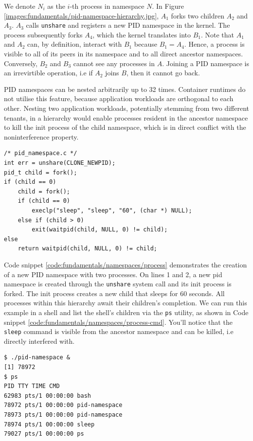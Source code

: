 We denote $N_{i}$ as the $i$-th process in namespace $N$. 
In Figure \ref{images:fundamentals/pid-namespace-hierarchy.jpg},
$A_{1}$ forks two children $A_{2}$ and $A_{3}$. 
$A_{3}$ calls \verb|unshare| and registers a new PID namespace in the kernel. The process 
subsequently forks $A_{4}$, which the kernel translates into $B_{1}$.
Note that $A_{1}$ and $A_{2}$ can, by definition, interact with $B_{1}$ because $B_{1} = A_{4}$.  
Hence, a process is visible to all of its peers in its namespace and to all direct ancestor
namespaces. Conversely, $B_{2}$ and $B_{3}$ cannot see any processes in $A$. 
Joining a PID namespace is an irrevirtible operation, i.e if $A_{2}$ joins $B$,
then it cannot go back.

PID namespaces can be nested arbitrarily up to 32 times. 
Container runtimes do not utilise this feature, because application workloads are orthogonal 
to each other. Nesting two application workloads, potentially stemming from two different tenants, in a hierarchy
would enable processes resident in the ancestor namespace to kill the init process of the child namespace, which 
is in direct conflict with the noninterference property. 

\begin{lstlisting}[style=c-code-snippets, label={code:fundamentals/namespaces/process}, caption={PID namespace creation pseudocode}]
/* pid_namespace.c */
int err = unshare(CLONE_NEWPID);
pid_t child = fork();
if (child == 0) 
    child = fork();
    if (child == 0)
        execlp("sleep", "sleep", "60", (char *) NULL);
    else if (child > 0)
        exit(waitpid(child, NULL, 0) != child);
else 
    return waitpid(child, NULL, 0) != child;
\end{lstlisting}

Code snippet \ref{code:fundamentals/namespaces/process} demonstrates the creation of a new 
PID namespace with two processes. On lines 1 and 2, a new 
pid namespace is created through the \verb|unshare| system call and its init process is forked. 
The init process creates a new child that sleeps for 60 seconds. All processes within this 
hierarchy await their children's completion. 
We can run this example in a shell and list the shell's children via the \verb|ps|
utility, as shown in Code snippet \ref{code:fundamentals/namespaces/process-cmd}. 
You'll notice that the \verb|sleep| command is visible from the ancestor namespace and can be killed,
i.e directly interfered with. 
\begin{lstlisting}[label={code:fundamentals/namespaces/process-cmd}, style=bash, caption={Example of creating a PID namespace and listing all processes in the child namespace from a process in the parent namespace}]
$ ./pid-namespace &
[1] 78972
$ ps
PID TTY TIME CMD
62983 pts/1 00:00:00 bash
78972 pts/1 00:00:00 pid-namespace
78973 pts/1 00:00:00 pid-namespace
78974 pts/1 00:00:00 sleep
79027 pts/1 00:00:00 ps
\end{lstlisting}

